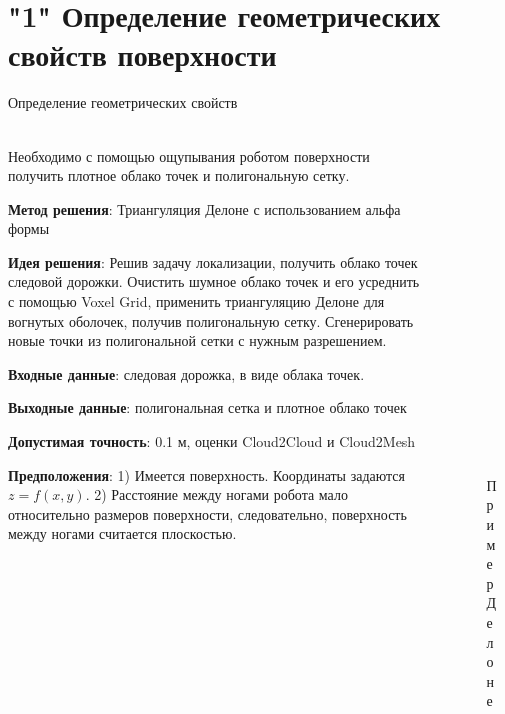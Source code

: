 \documentclass[aspectratio=169,xcolor=table,10pt]{beamer}
\begin{document}
\section{"1" Определение геометрических свойств поверхности}

\begin{frame}[t]{Определение геометрических свойств}
\framesubtitle{}
    \begin{columns}[T,onlytextwidth]
        \begin{column}{0.69\textwidth}
            \small
            Необходимо с помощью ощупывания роботом поверхности получить плотное облако точек и полигональную сетку.

            \textbf{Метод решения}: Триангуляция Делоне с использованием альфа формы

            \textbf{Идея решения}: Решив задачу локализации, получить облако точек следовой дорожки. Очистить шумное облако точек и его усреднить с помощью Voxel Grid, применить триангуляцию Делоне для вогнутых оболочек, получив полигональную сетку. Сгенерировать новые точки из полигональной сетки с нужным разрешением.

            \textbf{Входные данные}: следовая дорожка, в виде облака точек.
            
            \textbf{Выходные данные}: полигональная сетка и плотное облако точек
            
            \textbf{Допустимая точность}: 0.1 м, оценки Cloud2Cloud и Cloud2Mesh

            \textbf{Предположения}: 1) Имеется поверхность. Координаты задаются $z=f(x,y)$. 2) Расстояние между ногами робота мало относительно размеров поверхности, следовательно, поверхность между ногами считается плоскостью.   
        \end{column}
        \begin{column}{0.29\textwidth}
            \begin{figure}[H]
                \begin{subfigure}{0.99\textwidth}
                    \centering\includegraphics[height=2cm,width=1\textwidth,keepaspectratio]{../images/slides/delone_mag.png}
                    \caption{Пример Делоне}
                \end{subfigure}


\end{figure}
\end{column}
\end{columns}
\end{frame}
\end{document}
